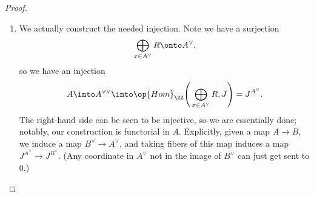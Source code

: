 \documentclass[../notes.tex]{subfiles}
\begin{document}
\begin{proof}
\begin{enumerate}
		\item We actually construct the needed injection.  Note we have a surjection
		\[\bigoplus_{x\in A^\lor}R\onto A^\lor,\]
		so we have an injection
		\[A\into A^{\lor\lor}\into\op{Hom}_\ZZ\Bigg(\bigoplus_{x\in A^\lor}R,J\Bigg)=J^{A^\lor}.\]
		The right-hand side can be seen to be injective, so we are essentially done; notably, our construction is functorial in $A$. Explicitly, given a map $A\to B$, we induce a map $B^\lor\to A^\lor$, and taking fibers of this map induces a map $J^{A^\lor}\to J^{B^\lor}$. (Any coordinate in $A^\lor$ not in the image of $B^\lor$ can just get sent to $0$.)
		\qedhere
	\end{enumerate}
\end{proof}
\end{document}
